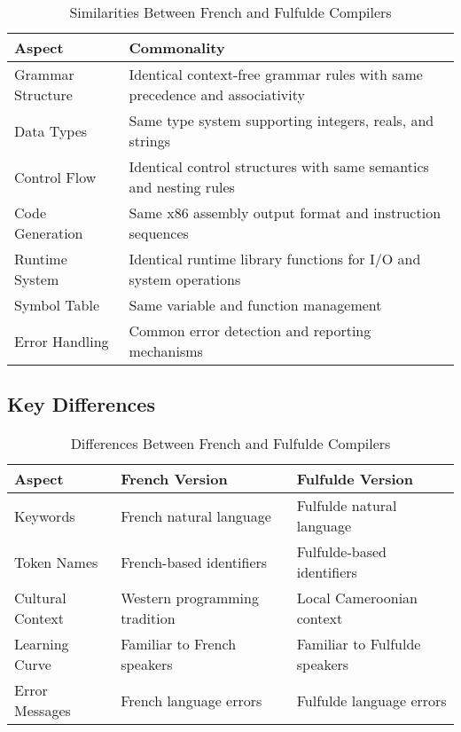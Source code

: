 \documentclass[12pt,a4paper]{article}
\begin{document}
\begin{table}[htbp]
\centering
\caption{Similarities Between French and Fulfulde Compilers}
\label{tab:similarities}
\begin{tabular}{@{}p{3cm}p{8cm}@{}}
\toprule
\textbf{Aspect} & \textbf{Commonality} \\
\midrule
Grammar Structure & Identical context-free grammar rules with same precedence and associativity \\
Data Types & Same type system supporting integers, reals, and strings \\
Control Flow & Identical control structures with same semantics and nesting rules \\
Code Generation & Same x86 assembly output format and instruction sequences \\
Runtime System & Identical runtime library functions for I/O and system operations \\
Symbol Table & Same variable and function management \\
Error Handling & Common error detection and reporting mechanisms \\
\bottomrule
\end{tabular}
\end{table}

\subsection{Key Differences}

\begin{table}[htbp]
\centering
\caption{Differences Between French and Fulfulde Compilers}
\label{tab:differences}
\begin{tabular}{@{}p{2.5cm}p{4cm}p{4cm}@{}}
\toprule
\textbf{Aspect} & \textbf{French Version} & \textbf{Fulfulde Version} \\
\midrule
Keywords & French natural language & Fulfulde natural language \\
Token Names & French-based identifiers & Fulfulde-based identifiers \\
Cultural Context & Western programming tradition & Local Cameroonian context \\
Learning Curve & Familiar to French speakers & Familiar to Fulfulde speakers \\
Error Messages & French language errors & Fulfulde language errors \\
\bottomrule
\end{tabular}
\end{table}
\end{document}
